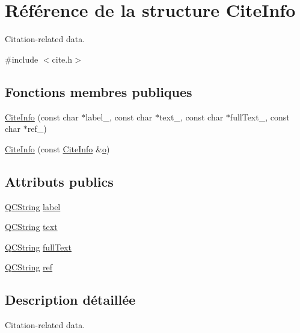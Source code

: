 \hypertarget{struct_cite_info}{}\section{Référence de la structure Cite\+Info}
\label{struct_cite_info}


Citation-\/related data.  




{\ttfamily \#include $<$cite.\+h$>$}

\subsection*{Fonctions membres publiques}
\begin{DoxyCompactItemize}
\item 
\hyperlink{struct_cite_info_a2546c0db77c9357896fe497171ff2b51}{Cite\+Info} (const char $\ast$label\+\_\+, const char $\ast$text\+\_, const char $\ast$full\+Text\+\_, const char $\ast$ref\+\_)
\item 
\hyperlink{struct_cite_info_ac9e08095b548dfb6d1e78197de8d222a}{Cite\+Info} (const \hyperlink{struct_cite_info}{Cite\+Info} \&\hyperlink{060__command__switch_8tcl_a495e7a4ede0831107e9d435080a7c268}{o})
\end{DoxyCompactItemize}
\subsection*{Attributs publics}
\begin{DoxyCompactItemize}
\item 
\hyperlink{class_q_c_string}{Q\+C\+String} \hyperlink{struct_cite_info_a890d06cbf9082f55099c244a53319ea2}{label}
\item 
\hyperlink{class_q_c_string}{Q\+C\+String} \hyperlink{struct_cite_info_a2823a2e8898a833bacf931d188e1fd19}{text}
\item 
\hyperlink{class_q_c_string}{Q\+C\+String} \hyperlink{struct_cite_info_a0afbc201283c71463729e97ff3e981df}{full\+Text}
\item 
\hyperlink{class_q_c_string}{Q\+C\+String} \hyperlink{struct_cite_info_a5d290206c0dc2efaf99b253c4413aac6}{ref}
\end{DoxyCompactItemize}


\subsection{Description détaillée}
Citation-\/related data. 

